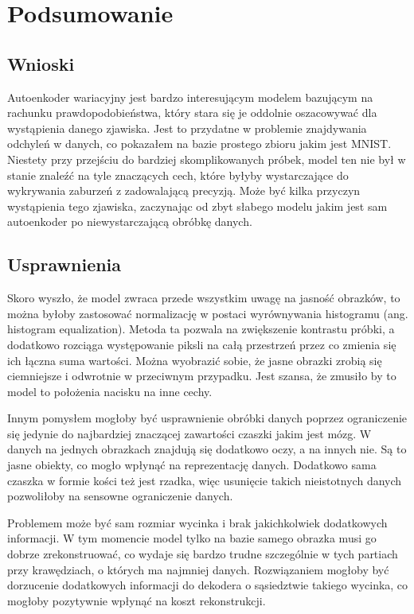 \chapter{Podsumowanie}

\section{Wnioski}

Autoenkoder wariacyjny jest bardzo interesującym modelem bazującym na rachunku prawdopodobieństwa, który stara się je oddolnie oszacowywać dla wystąpienia danego zjawiska. Jest to przydatne w problemie znajdywania odchyleń w danych, co pokazałem na bazie prostego zbioru jakim jest MNIST. Niestety przy przejściu do bardziej skomplikowanych próbek, model ten nie był w stanie znaleźć na tyle znaczących cech, które byłyby wystarczające do wykrywania zaburzeń z zadowalającą precyzją. Może być kilka przyczyn wystąpienia tego zjawiska, zaczynając od zbyt słabego modelu jakim jest sam autoenkoder po niewystarczającą obróbkę danych.

\section{Usprawnienia}

Skoro wyszło, że model zwraca przede wszystkim uwagę na jasność obrazków, to można byłoby zastosować normalizację w postaci wyrównywania histogramu (ang. histogram equalization). Metoda ta pozwala na zwiększenie kontrastu próbki, a dodatkowo rozciąga występowanie piksli na całą przestrzeń przez co zmienia się ich łączna suma wartości. Można wyobrazić sobie, że jasne obrazki zrobią się ciemniejsze i odwrotnie w przeciwnym przypadku. Jest szansa, że zmusiło by to model to położenia nacisku na inne cechy.

Innym pomysłem mogłoby być usprawnienie obróbki danych poprzez ograniczenie się jedynie do najbardziej znaczącej zawartości czaszki jakim jest mózg. W danych na jednych obrazkach znajdują się dodatkowo oczy, a na innych nie. Są to jasne obiekty, co mogło wpłynąć na reprezentację danych. Dodatkowo sama czaszka w formie kości też jest rzadka, więc usunięcie takich nieistotnych danych pozwoliłoby na sensowne ograniczenie danych.

Problemem może być sam rozmiar wycinka i brak jakichkolwiek dodatkowych informacji. W tym momencie model tylko na bazie samego obrazka musi go dobrze zrekonstruować, co wydaje się bardzo trudne szczególnie w tych partiach przy krawędziach, o których ma najmniej danych. Rozwiązaniem mogłoby być dorzucenie dodatkowych informacji do dekodera o sąsiedztwie takiego wycinka, co mogłoby pozytywnie wpłynąć na koszt rekonstrukcji.

